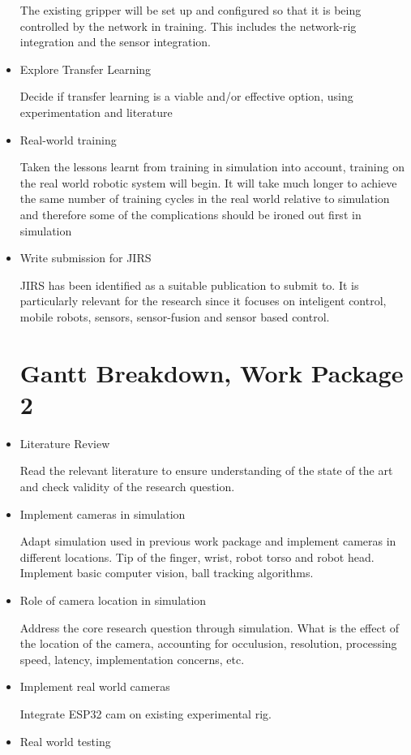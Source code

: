 \begin{itemize}
    The existing gripper will be set up and configured so that it is being controlled by the network in training. This includes the network-rig integration and the sensor integration.
    \item Explore Transfer Learning
    
    Decide if transfer learning is a viable and/or effective option, using experimentation and literature
    \item Real-world training
    
    Taken the lessons learnt from training in simulation into account, training on the real world robotic system will begin. It will take much longer to achieve the same number of training cycles in the real world relative to simulation and therefore some of the complications should be ironed out first in simulation
    \item Write submission for JIRS
    
    JIRS has been identified as a suitable publication to submit to. It is particularly relevant for the research since it focuses on inteligent control, mobile robots, sensors, sensor-fusion and sensor based control.

\newpage

\section{Gantt Breakdown, Work Package 2}\label{GanttBreakdownWP2}
    \item Literature Review
    
    Read the relevant literature to ensure understanding of the state of the art and check validity of the research question.
    \item Implement cameras in simulation
    
    Adapt simulation used in previous work package and implement cameras in different locations. Tip of the finger, wrist, robot torso and robot head. Implement basic computer vision, ball tracking algorithms.
    \item Role of camera location in simulation
    
    Address the core research question through simulation. What is the effect of the location of the camera, accounting for occulusion, resolution, processing speed, latency, implementation concerns, etc.
    \item Implement real world cameras
    
    Integrate ESP32 cam on existing experimental rig.
    \item Real world testing
    

\end{itemize}
